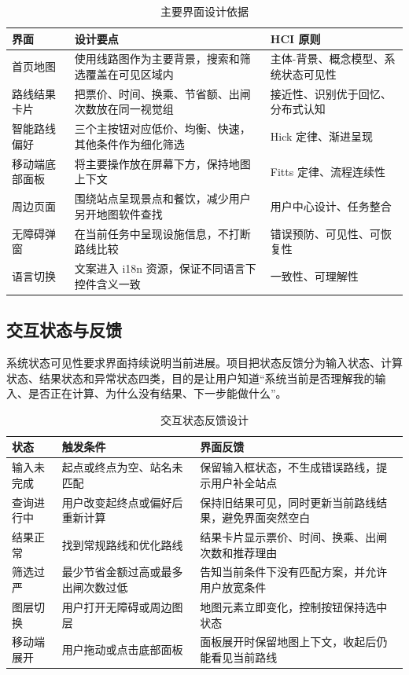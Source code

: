 \documentclass[UTF8,a4paper,11pt]{ctexart}
\begin{document}
\begin{table}[H]
  \centering
  \caption{主要界面设计依据}
  \begin{tabularx}{\textwidth}{p{}YY}
    \toprule
    界面 & 设计要点 & HCI 原则 \\
    \midrule
    首页地图 & 使用线路图作为主要背景，搜索和筛选覆盖在可见区域内 & 主体-背景、概念模型、系统状态可见性 \\
    路线结果卡片 & 把票价、时间、换乘、节省额、出闸次数放在同一视觉组 & 接近性、识别优于回忆、分布式认知 \\
    智能路线偏好 & 三个主按钮对应低价、均衡、快速，其他条件作为细化筛选 & Hick 定律、渐进呈现 \\
    移动端底部面板 & 将主要操作放在屏幕下方，保持地图上下文 & Fitts 定律、流程连续性 \\
    周边页面 & 围绕站点呈现景点和餐饮，减少用户另开地图软件查找 & 用户中心设计、任务整合 \\
    无障碍弹窗 & 在当前任务中呈现设施信息，不打断路线比较 & 错误预防、可见性、可恢复性 \\
    语言切换 & 文案进入 i18n 资源，保证不同语言下控件含义一致 & 一致性、可理解性 \\
    \bottomrule
  \end{tabularx}
\end{table}

\subsection{交互状态与反馈}

系统状态可见性要求界面持续说明当前进展。项目把状态反馈分为输入状态、计算状态、结果状态和异常状态四类，目的是让用户知道“系统当前是否理解我的输入、是否正在计算、为什么没有结果、下一步能做什么”。

\begin{table}[H]
  \centering
  \caption{交互状态反馈设计}
  \begin{tabularx}{\textwidth}{p{}YY}
    \toprule
    状态 & 触发条件 & 界面反馈 \\
    \midrule
    输入未完成 & 起点或终点为空、站名未匹配 & 保留输入框状态，不生成错误路线，提示用户补全站点 \\
    查询进行中 & 用户改变起终点或偏好后重新计算 & 保持旧结果可见，同时更新当前路线结果，避免界面突然空白 \\
    结果正常 & 找到常规路线和优化路线 & 结果卡片显示票价、时间、换乘、出闸次数和推荐理由 \\
    筛选过严 & 最少节省金额过高或最多出闸次数过低 & 告知当前条件下没有匹配方案，并允许用户放宽条件 \\
    图层切换 & 用户打开无障碍或周边图层 & 地图元素立即变化，控制按钮保持选中状态 \\
    移动端展开 & 用户拖动或点击底部面板 & 面板展开时保留地图上下文，收起后仍能看见当前路线 \\
    \bottomrule
  \end{tabularx}
\end{table}
\end{document}
